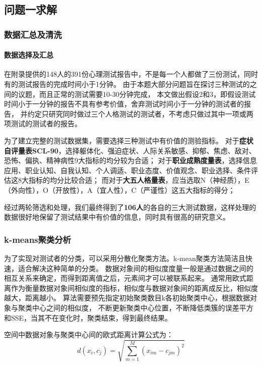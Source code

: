 \documentclass[withoutpreface,bwprint]{cumcmthesis} %
\begin{document}
\subsection{问题一求解}

\subsubsection{数据汇总及清洗}
\paragraph*{数据选择及汇总}
在附录提供的148人的391份心理测试报告中，不是每一个人都做了三份测试，同时有的测试报告的完成时间小于1分钟。
由于本题大部分问题旨在探讨三种测试的之间的议题，而且正常的测试需要10-30分钟完成\cite{SCL-90}\cite{The Career Development Quarterly}\cite{The Big Five trait taxonomy}，
本文做出假设2和3，即假设测试时间小于一分钟的报告不具有参考价值，舍弃测试时间小于一分钟的测试者的报告，
并约定只研究同时做过三个人格测试的测试者，不考虑只做过其中一项或两项测试的测试者的报告。

为了建立完整的测试数据集，需要选择三种测试中有价值的测验指标。
对于\textbf{症状自评量表SCL-90}，选择躯体化、强迫症状、人际关系敏感、抑郁、焦虑、敌对、恐怖、偏执、精神病性9大指标的均分较为合适；
对于\textbf{职业成熟度量表}，选择信息应用、职业认知、自我认知、个人调适、职业态度、价值观念、职业选择、条件评估这8大指标的均分比较合适；
而对于\textbf{大五人格量表}，应当选取N（神经质），E（外向性），O（开放性），A（宜人性），C（严谨性）这五大指标的得分；

经过两轮筛选和处理，我们最终得到了\textbf{106人}的各自的三大测试数据，这样处理的数据很好地保留了测试结果中有价值的信息，同时具有很高的研究意义。


\subsubsection{k-means聚类分析}

为了实现对测试者的分类，可以采用分散化聚类方法。k-mean聚类方法简洁且快速，适合解决这种简单的分类。
数据对象间的相似度度量一般是通过数据之间的相互关系来确定，而得到距离值之后，元素间才可以被联系起来。
通常用欧式距离作为衡量数据对象间相似度的指标，相似度与数据对象间的距离成反比，相似度越大，距离越小。
算法需要预先指定初始聚类数目k各初始聚类中心，根据数据对象与聚类中心之间的相似度，
不断更新聚类中心位置，不断降低类簇的误差平方和SSE，当其不在变化时，聚类结束，得到最终结果。


空间中数据对象与聚类中心间的欧式距离计算公式为：
\begin{equation}
    d(x_i, c_j) = \sqrt{\sum_{m=1}^M (x_{im} - c_{jm})^2}
    \label{eq:distance}
\end{equation}
\end{document}
